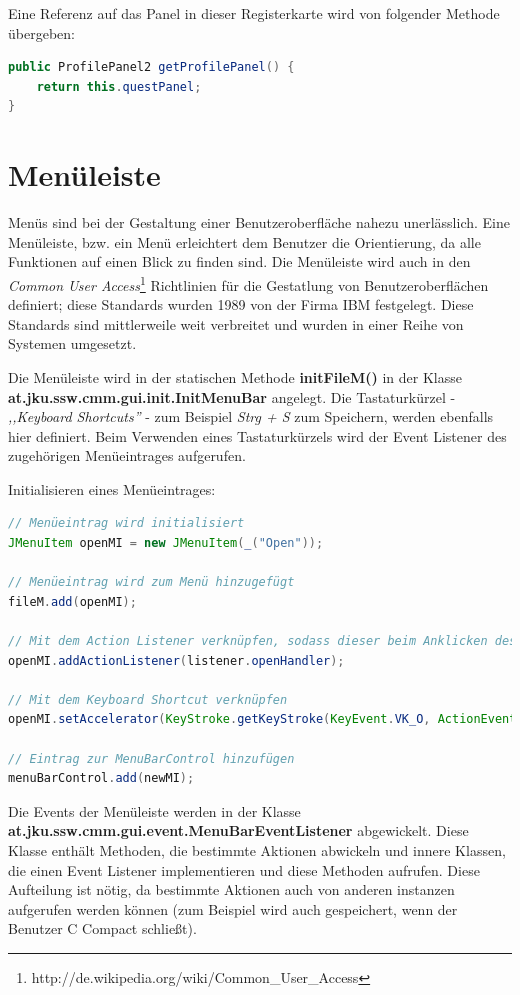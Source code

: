 Eine Referenz auf das Panel in dieser Registerkarte wird von folgender Methode übergeben:
\begin{lstlisting}[language=JAVA]
public ProfilePanel2 getProfilePanel() {
	return this.questPanel;
}
\end{lstlisting}

\section{Menüleiste}
Menüs sind bei der Gestaltung einer Benutzeroberfläche nahezu unerlässlich. Eine Menüleiste, bzw. ein Menü erleichtert dem Benutzer die Orientierung, da alle Funktionen auf einen Blick zu finden sind. Die Menüleiste wird auch in den \emph{Common User Access}\footnote{http://de.wikipedia.org/wiki/Common\_User\_Access} Richtlinien für die Gestatlung von Benutzeroberflächen definiert; diese Standards wurden 1989 von der Firma IBM festgelegt. Diese Standards sind mittlerweile weit verbreitet und wurden in einer Reihe von Systemen umgesetzt.

Die Menüleiste wird in der statischen Methode \textbf{initFileM()} in der Klasse \textbf{at.jku.ssw.cmm.gui.init.InitMenuBar} angelegt. Die Tastaturkürzel - \emph{,,Keyboard Shortcuts''} - zum Beispiel \emph{Strg + S} zum Speichern, werden ebenfalls hier definiert. Beim Verwenden eines Tastaturkürzels wird der Event Listener des zugehörigen Menüeintrages aufgerufen.

Initialisieren eines Menüeintrages:
\begin{lstlisting}[language=JAVA]
// Menüeintrag wird initialisiert
JMenuItem openMI = new JMenuItem(_("Open"));

// Menüeintrag wird zum Menü hinzugefügt
fileM.add(openMI);

// Mit dem Action Listener verknüpfen, sodass dieser beim Anklicken des Menüs aufgerufen wird
openMI.addActionListener(listener.openHandler);

// Mit dem Keyboard Shortcut verknüpfen
openMI.setAccelerator(KeyStroke.getKeyStroke(KeyEvent.VK_O, ActionEvent.CTRL_MASK));

// Eintrag zur MenuBarControl hinzufügen
menuBarControl.add(newMI);
\end{lstlisting}

Die Events der Menüleiste werden in der Klasse \textbf{at.jku.ssw.cmm.gui.event.MenuBarEventListener} abgewickelt. Diese Klasse enthält Methoden, die bestimmte Aktionen abwickeln und innere Klassen, die einen Event Listener implementieren und diese Methoden aufrufen. Diese Aufteilung ist nötig, da bestimmte Aktionen auch von anderen instanzen aufgerufen werden können (zum Beispiel wird auch gespeichert, wenn der Benutzer C Compact schließt).


